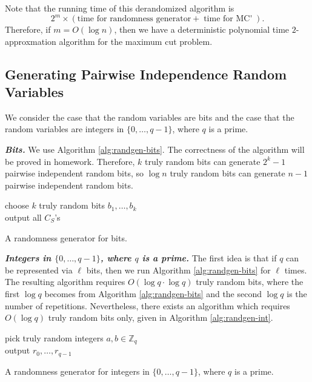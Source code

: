 \documentclass[letterpaper, reqno,11pt]{article}
\newcommand{\ZZ}{\mathbb{Z}}
\DeclareMathOperator{\MCprime}{MC'}
\begin{document}
Note that the running time of this derandomized algorithm is
$$ 2^m \times \left(\text{time for randomness generator} + \text{time for $\MCprime$}\right). $$
Therefore, if $m = O(\log n)$, then we have a deterministic polynomial time $2$-approxmation algorithm for the maximum cut problem.

\subsection{Generating Pairwise Independence Random Variables}

We consider the case that the random variables are bits and the case that the random variables are integers in $\{ 0, \ldots, q - 1 \}$, where $q$ is a prime.

{\bf \em Bits.} We use Algorithm \ref{alg:randgen-bits}. The correctness of the algorithm will be proved in homework. Therefore, $k$ truly random bits can generate $2^k - 1$ pairwise independent random bits, so $\log n$ truly random bits can generate $n - 1$ pairwise independent random bits.

\begin{algorithm}
  choose $k$ truly random bits $b_1, \ldots, b_k$ \\
  output all $C_S$'s
  \caption{A randomness generator for bits.}
  \label{alg:randgen-bits}
\end{algorithm}

{\bf \em Integers in $\{ 0, \ldots, q - 1\}$, where $q$ is a prime.} The first idea is that if $q$ can be represented via $\ell$ bits, then we run Algorithm \ref{alg:randgen-bits} for $\ell$ times. The resulting algorithm requires $O(\log q \cdot \log q)$ truly random bits, where the first $\log q$ becomes from Algorithm \ref{alg:randgen-bits} and the second $\log q$ is the number of repetitions. Nevertheless, there exists an algorithm which requires $O(\log q)$ truly random bits only, given in Algorithm \ref{alg:randgen-int}.

\begin{algorithm}
  pick truly random integers $a, b \in \ZZ_q$ \\
  output $r_0, \ldots, r_{q - 1}$
  \caption{A randomness generator for integers in $\{ 0, \ldots, q - 1 \}$, where $q$ is a prime.}
  \label{alg:randgen-int}
\end{algorithm}
\end{document}
